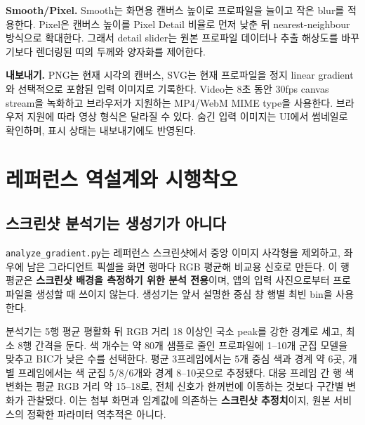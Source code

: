 \documentclass[10pt]{article}
\begin{document}
\textbf{Smooth/Pixel.} Smooth는 화면용 캔버스 높이로 프로파일을 늘이고 작은 blur를 적용한다. Pixel은 캔버스 높이를 Pixel Detail 비율로 먼저 낮춘 뒤 nearest-neighbour 방식으로 확대한다. 그래서 detail slider는 원본 프로파일 데이터나 추출 해상도를 바꾸기보다 렌더링된 띠의 두께와 양자화를 제어한다.

\textbf{내보내기.} PNG는 현재 시각의 캔버스, SVG는 현재 프로파일을 정지 linear gradient와 선택적으로 포함된 입력 이미지로 기록한다. Video는 8초 동안 30fps canvas stream을 녹화하고 브라우저가 지원하는 MP4/WebM MIME type을 사용한다. 브라우저 지원에 따라 영상 형식은 달라질 수 있다. 숨긴 입력 이미지는 UI에서 썸네일로 확인하며, 표시 상태는 내보내기에도 반영된다.

\section{레퍼런스 역설계와 시행착오}
\subsection*{스크린샷 분석기는 생성기가 아니다}
\texttt{analyze\_gradient.py}는 레퍼런스 스크린샷에서 중앙 이미지 사각형을 제외하고, 좌우에 남은 그라디언트 픽셀을 화면 행마다 RGB 평균해 비교용 신호로 만든다. 이 행 평균은 \textbf{스크린샷 배경을 측정하기 위한 분석 전용}이며, 앱의 입력 사진으로부터 프로파일을 생성할 때 쓰이지 않는다. 생성기는 앞서 설명한 중심 창 행별 최빈 bin을 사용한다.

분석기는 5행 평균 평활화 뒤 RGB 거리 18 이상인 국소 peak를 강한 경계로 세고, 최소 8행 간격을 둔다. 색 개수는 약 80개 샘플로 줄인 프로파일에 1--10개 군집 모델을 맞추고 BIC가 낮은 수를 선택한다. 평균 3프레임에서는 5개 중심 색과 경계 약 6곳, 개별 프레임에서는 색 군집 5/8/6개와 경계 8--10곳으로 추정됐다. 대응 프레임 간 행 색 변화는 평균 RGB 거리 약 15--18로, 전체 신호가 한꺼번에 이동하는 것보다 구간별 변화가 관찰됐다. 이는 첨부 화면과 임계값에 의존하는 \textbf{스크린샷 추정치}이지, 원본 서비스의 정확한 파라미터 역추적은 아니다.
\end{document}
